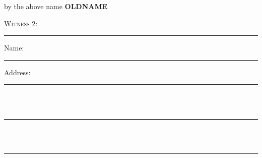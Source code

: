 \documentclass[10pt, twoside, a4paper]{article}
\begin{document}
\begin{multicols}{2}
	{
		\centering
		\noindent
		by the above name \textbf{OLDNAME}
		\par
	}

	\vspace{60pt}

	{\scshape \noindent Witness 2:}

	\vspace{48pt}
	\par\noindent\hrule
	\vspace{14pt}

	{
		\scshape

		\noindent Name: \\
		\noindent\hspace*{4em}\rule{0.35\textwidth}{0.5pt}

		\vspace{12pt}

		\noindent Address:

		\noindent\hspace*{4em}\rule{0.35\textwidth}{0.5pt} \\ \\
		\noindent\hspace*{4em}\rule{0.35\textwidth}{0.5pt} \\ \\
		\noindent\hspace*{4em}\rule{0.35\textwidth}{0.5pt}
	}

\end{multicols}
\end{document}
